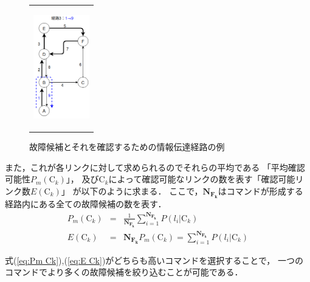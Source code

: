 \documentclass[11pt]{jsarticle}%
\begin{document}
\begin{multicols}{2}
\begin{figure}[H]
\begin{tabular}{c}
\begin{minipage}{0.30\hsize}
           \label{fig:route2}
        \end{minipage}
        \begin{minipage}{0.30\hsize}
           \centering
           \includegraphics[height=4.5cm]{../figure/route3.png}
              \label{fig:route2}
           \end{minipage}
     \end{tabular} 
     \caption{故障候補とそれを確認するための情報伝達経路の例}%
     \label{fig:route}
\end{figure}
また，これが各リンクに対して求められるのでそれらの平均である
「平均確認可能性$P_m(\text{C}_k)$」，
及びC$_k$によって確認可能なリンクの数を表す「確認可能リンク数$E(\text{C}_k)$」
が以下のように求まる．
ここで，$\mathbf{N_{F_k}}$はコマンドが形成する経路内にある全ての故障候補の数を表す．
\begin{eqnarray}
  P_m(\text{C}_k) &=& \frac{1}{\mathbf{N_{F_k}}}\sum_{i=1}^{\mathbf{N_{F_k}}}
  P(l_i|\text{C}_k) \label{eq:Pm Ck} \\
  E(\text{C}_k) &=& \mathbf{N_{F_k}}P_m(\text{C}_k) =
   \sum_{i=1}^{\mathbf{N_{F_k}}}P(l_i|\text{C}_k) \label{eq:E Ck}
\end{eqnarray}

式(\ref{eq:Pm Ck}),(\ref{eq:E Ck})がどちらも高いコマンドを選択することで，
一つのコマンドでより多くの故障候補を絞り込むことが可能である．


\end{multicols}
\end{document}
